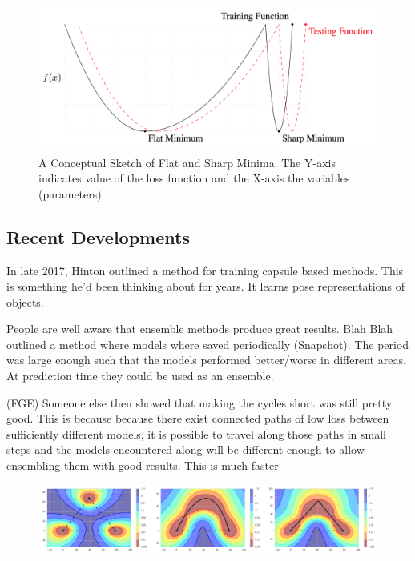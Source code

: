 \begin{figure}
    \centering
    \includegraphics[width=\textwidth]{./img/Wide_optima.png}
    \caption{A Conceptual Sketch of Flat and Sharp Minima. The Y-axis indicates value of the loss function and the X-axis the variables (parameters) \cite{Keskar_Mudigere_Nocedal_Smelyanskiy_Tang_2016}}
    \label{fig:wide_optima}
\end{figure}


\subsection{Recent Developments}\label{subsec:recent_improvements}
In late 2017, Hinton outlined a method for training capsule based methods.
This is something he'd been thinking about for years.
It learns pose representations of objects.

People are well aware that ensemble methods produce great results.
Blah Blah outlined a method where models where saved periodically (Snapshot).
The period was large enough such that the models performed better/worse in different areas.
At prediction time they could be used as an ensemble.

(FGE) Someone else then showed that making the cycles short was still pretty good.
This is because because there exist connected paths of low loss between sufficiently different models, it is possible to travel along those paths in small steps and the models encountered along will be different enough to allow ensembling them with good results.
This is much faster



\begin{figure}
    \centering
    \includegraphics[width=\textwidth]{./img/FGE.png}
    \caption{\cite{Garipov_Izmailov_Podoprikhin_Vetrov_Wilson_2018}}
    \label{fig:FGE_shortest_path}
\end{figure}

